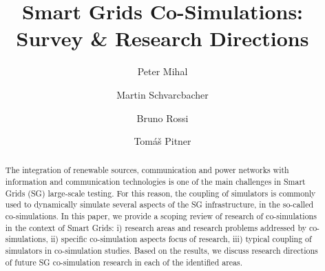 \documentclass[1p]{elsarticle} %
\begin{document}
\begin{frontmatter}

\title{Smart Grids Co-Simulations: Survey \& Research Directions}



\author[First]{Peter Mihal}

\author[Second]{Martin Schvarcbacher}

\author[First]{Bruno Rossi}

\author[First]{Tomáš Pitner}

\address[First]{Faculty of Informatics, Masaryk University, Brno, Czech Republic}
\address[Second]{Faculty of Science, University of Amsterdam, Netherlands}

% 
% 
% 


\begin{abstract}
The integration of renewable sources, communication and power networks with information and communication technologies is one of the main challenges in Smart Grids (SG) large-scale testing. For this reason, the coupling of simulators is commonly used to dynamically simulate several aspects of the SG infrastructure, in the so-called co-simulations.
In this paper, we provide a scoping review of research of co-simulations in the context of Smart Grids: i) research areas and research problems addressed by co-simulations, ii) specific co-simulation aspects focus of research, iii) typical coupling of simulators in co-simulation studies. Based on the results, we discuss research directions of future SG co-simulation research in each of the identified areas.


\end{abstract}
\end{frontmatter}
\end{document}
